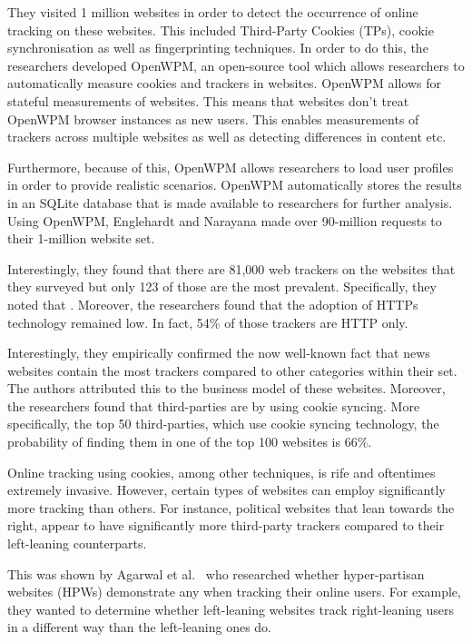 \documentclass[../main.tex]{subfiles}
\begin{document}
They visited 1 million websites in order to detect the occurrence of online tracking on these websites. This included Third-Party Cookies (TPs), cookie synchronisation as well as fingerprinting techniques. In order to do this, the researchers developed OpenWPM, an open-source tool which allows researchers to automatically measure cookies and trackers in websites. OpenWPM allows for stateful measurements of websites. This means that websites don’t treat OpenWPM browser instances as new users. This enables measurements of trackers across multiple websites as well as detecting differences in content etc. 

Furthermore, because of this, OpenWPM allows researchers to load user profiles in order to provide realistic scenarios. OpenWPM automatically stores the results in an SQLite database that is made available to researchers for further analysis. Using OpenWPM, Englehardt and Narayana made over 90-million requests to their 1-million website set. 

Interestingly, they found that there are 81,000 web trackers on the websites that they surveyed but only 123 of those are the most prevalent. Specifically, they noted that . Moreover, the researchers found that the adoption of HTTPs technology remained low. In fact, 54\% of those trackers are HTTP only. 

Interestingly, they empirically confirmed the now well-known fact that news websites contain the most trackers compared to other categories within their set. The authors attributed this to the business model of these websites. Moreover, the researchers found that third-parties are  by using cookie syncing. More specifically, the top 50 third-parties, which use cookie syncing technology, the probability of finding them in one of the top 100 websites is 66\%.

Online tracking using cookies, among other techniques, is rife and oftentimes extremely invasive. However, certain types of websites can employ significantly more tracking than others. For instance, political websites that lean towards the right, appear to have significantly more third-party trackers compared to their left-leaning counterparts. 

This was shown by Agarwal et al.~\cite{agarwal2020stop} who researched whether hyper-partisan websites (HPWs) demonstrate any  when tracking their online users. For example, they wanted to determine whether left-leaning websites track right-leaning users in a different way than the left-leaning ones do. 
\end{document}
